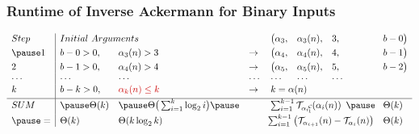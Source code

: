 \begin{frame}
\frametitle{Runtime of Inverse Ackermann for Binary Inputs}

\begin{equation*}
\begin{array}{l|llllllll}
Step & \multicolumn{2}{l}{Initial \ Arguments} &  &  \big(\alpha_3, & \alpha_3(n), & 3, & b - 0 \big) \\[3pt]
\pause 1 & b - 0 > 0, & \alpha_3(n) > 3 & \to & \big(\alpha_4, & \alpha_4(n), & 4, & b - 1\big) \\[3pt]
2 & b - 1 > 0, & \alpha_4(n) > 4 & \to  & \big(\alpha_5, & \alpha_5(n), & 5, & b - 2\big) \\
\cdots & \cdots &\cdots & \cdots & \cdots & \cdots & \cdots \\
k & b - k > 0, & {\color{red} \alpha_{k}(n) \le k} & \to  & \multicolumn{4}{l}{k = \alpha(n)} \\[3pt] \hline
SUM & \pause \Theta(k) & \pause \Theta\big(\sum_{i=1}^{k}\log_2i\big) \pause & & \multicolumn{3}{r}{\sum_{i=1}^{k-1} \runtime_{\cdt{\alpha_i}{1}} (\alpha_i(n))} \pause & \Theta(k) \\[3pt]
\pause = & \Theta(k) & \Theta(k\log_2k) & \multicolumn{4}{r}{\sum_{i=1}^{k-1} \big(\runtime_{\alpha_{i+1}}(n) - \runtime_{\alpha_i}(n) \big)} & \Theta(k)
\end{array}
\end{equation*}

\smallskip

\pause 
{}

\end{frame}


